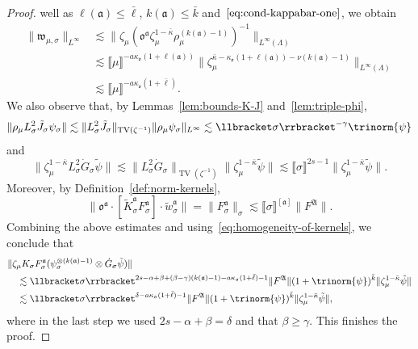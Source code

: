 \documentclass{article}
\numberwithin{equation}{section}
\theoremstyle{plain}
\theoremstyle{definition}
\begin{document}
\begin{proof}
  well as $\ell (\mathfrak{a}) \leqslant \bar{\ell}$, $k (\mathfrak{a})
  \leqslant \bar{k}$ and~$\eqref{eq:cond-kappabar-one}$, we obtain
  \begin{equation}
    \begin{aligned}
      \| \mathfrak{w}_{\mu, \sigma} \|_{L^{\infty}} & \lesssim \|
      \zeta_{\mu} (\mathfrak{o}^{\mathfrak{a}} \zeta^{1 - \bar{\kappa}}_{\mu}
      \rho_{\mu}^{(k (\mathfrak{a}) - 1)})^{- 1} \|_{L^{\infty} (\Lambda)}\\
      & \lesssim \llbracket \mu \rrbracket^{- a
      \kappa_{\mathfrak{o}} (1 + \ell (\mathfrak{a}))}  \| \zeta^{\bar{\kappa}
      - \kappa_{\mathfrak{o}} (1 + \ell (\mathfrak{a})) - \nu (k
      (\mathfrak{a}) - 1)}_{\mu} \|_{L^{\infty} (\Lambda)}\\
      & \lesssim \llbracket \mu \rrbracket^{- a
      \kappa_{\mathfrak{o}} (1 + \bar{\ell})} .
    \end{aligned} \label{eq:weight-bound-2}
  \end{equation}
  We also observe that, by Lemmas~\ref{lem:bounds-K-J}
  and~\ref{lem:triple-phi},
  \[ \| \rho_{\mu} L_{\sigma}^2 \tilde{J}_{\sigma} \psi_{\sigma} \| \lesssim
     \| L_{\sigma}^2 \tilde{J}_{\sigma} \|_{\operatorname{TV} (\zeta^{- 1}) } \|
     \rho_{\mu} \psi_{\sigma} \|_{L^{\infty}} \lesssim \llbracket \sigma
     \rrbracket^{- \gamma}  \trinorm{ \psi }  \]
  and
  \[ \| \zeta_{\mu}^{1 - \bar{\kappa}} L_{\sigma}^2 \dot{G}_{\sigma}
     \tilde{\psi} \| \lesssim \| L_{\sigma}^2 \dot{G}_{\sigma} \|_{\operatorname{TV}
     (\zeta^{- 1}) }  \| \zeta_{\mu}^{1 - \bar{\kappa}} \tilde{\psi} \|
     \lesssim \llbracket \sigma \rrbracket^{2 s - 1}  \| \zeta_{\mu}^{1 -
     \bar{\kappa}} \tilde{\psi} \| . \]
  Moreover, by Definition~\ref{def:norm-kernels},
  \[ \| \mathfrak{o}^{\mathfrak{a}} \cdot [\tilde{K}^{\mathfrak{a}}_{\sigma}
     F^{\mathfrak{a}}_{\sigma}] \cdot \tilde{w}_{\sigma}^{\mathfrak{a}} \| =
     \| F^{\mathfrak{a}}_{\sigma} \|_{\sigma} \lesssim \llbracket \sigma
     \rrbracket^{[\mathfrak{a}]} \| F^{\mathfrak{A}} \| . \]
  Combining the above estimates and using~\eqref{eq:homogeneity-of-kernels},
  we conclude that
  \begin{align*}
    &\| \zeta_{\mu} K_{\sigma} F_{\sigma}^{\mathfrak{a}}
    (\psi_{\sigma}^{\otimes (k(\mathfrak{a}) - 1)}
    \otimes \dot{G}_{\sigma} \tilde{\psi}) \|\\
    &\quad \lesssim
    \llbracket \sigma \rrbracket^{
    2 s - \alpha + \beta + (\beta - \gamma)(k(\mathfrak{a}) - 1)
    - a \kappa_{\mathfrak{o}}(1 + \bar{\ell}) - 1}
    \| F^{\mathfrak{A}} \|
    (1 + \trinorm{ \psi })^{\bar{k}}
    \| \zeta^{1 - \bar{\kappa}}_{\mu} \tilde{\psi} \|\\
    &\quad \lesssim
    \llbracket \sigma \rrbracket^{\delta
    - a \kappa_{\mathfrak{o}}(1 + \bar{\ell}) - 1}
    \| F^{\mathfrak{A}} \|
    (1 + \trinorm{ \psi })^{\bar{k}}
    \| \zeta^{1 - \bar{\kappa}}_{\mu} \tilde{\psi} \|,
  \end{align*}
  where in the last step we used $2 s - \alpha + \beta = \delta$ and that
  $\beta \geqslant \gamma$. This finishes the proof.
\end{proof}
\end{document}
